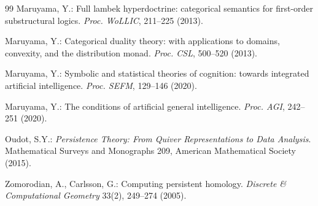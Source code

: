 \documentclass[runningheads]{llncs}
\begin{document}
\begin{thebibliography}{99}
Maruyama, Y.:
\newblock Full lambek hyperdoctrine: categorical semantics for first-order substructural logics.
\newblock \emph{Proc. WoLLIC}, 211--225 (2013).

Maruyama, Y.:
\newblock Categorical duality theory: with applications to domains, convexity, and the distribution monad.
\newblock \emph{Proc. CSL}, 500--520 (2013).

Maruyama, Y.:
\newblock Symbolic and statistical theories of cognition: towards integrated artificial intelligence.
\newblock \emph{Proc. SEFM}, 129--146 (2020).

Maruyama, Y.:
\newblock The conditions of artificial general intelligence.
\newblock \emph{Proc. AGI}, 242--251 (2020).

Oudot, S.Y.:
\newblock \emph{Persistence Theory: From Quiver Representations to Data Analysis}.
\newblock Mathematical Surveys and Monographs 209, American Mathematical Society (2015).

Zomorodian, A., Carlsson, G.:
\newblock Computing persistent homology.
\newblock \emph{Discrete \& Computational Geometry} 33(2), 249--274 (2005).

\end{thebibliography}
\end{document}
